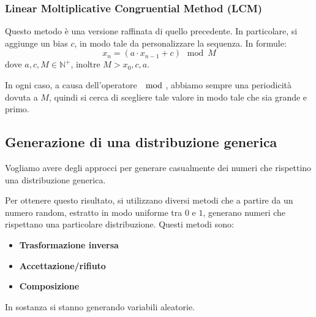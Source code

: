 \subsubsection{Linear Moltiplicative Congruential Method (LCM)}
Questo metodo è una versione raffinata di quello precedente. In particolare, si
aggiunge un bias $c$, in modo tale da personalizzare la sequenza. In formule:
\begin{equation}
    x_n = (a \cdot x_{n-1} + c) \mod M
\end{equation}
dove $a,c,M \in \mathbb{N}^+$, inoltre $M > x_0, c, a$.

In ogni caso, a causa dell'operatore $\mod$, abbiamo sempre una periodicità dovuta
a $M$, quindi si cerca di scegliere tale valore in modo tale che sia grande e primo.
\subsection{Generazione di una distribuzione generica}
Vogliamo avere degli approcci per generare casualmente dei numeri che rispettino
una distribuzione generica.

Per ottenere questo risultato, si utilizzano diversi metodi che a partire da un
numero random, estratto in modo uniforme tra $0$ e $1$, generano numeri che rispettano
una particolare distribuzione. Questi metodi sono:
\begin{itemize}
    \item \textbf{Trasformazione inversa}
    \item \textbf{Accettazione/rifiuto}
    \item \textbf{Composizione}
\end{itemize}
In sostanza si stanno generando variabili aleatorie.
